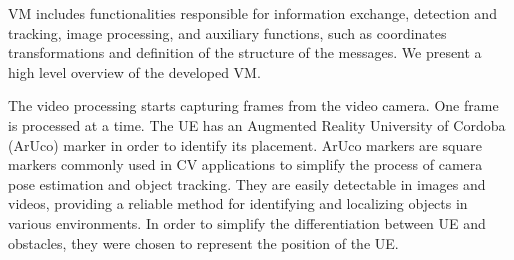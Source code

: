 \begin{table}[H]
    \caption{Summary of each message type.}
    \label{tab:message_type}
    \centering
\end{table}

VM includes functionalities responsible for information exchange, detection and tracking, image processing, and auxiliary functions, such as coordinates transformations and definition of the structure of the messages.
We present a high level overview of the developed VM\@.

The video processing starts capturing frames from the video camera.
One frame is processed at a time.
The UE has an Augmented Reality University of Cordoba (ArUco) marker in order to identify its placement.
ArUco markers are square markers commonly used in CV applications to simplify the process of camera pose estimation and object tracking.
They are easily detectable in images and videos, providing a reliable method for identifying and localizing objects in various environments.
In order to simplify the differentiation between UE and obstacles, they were chosen to represent the position of the UE\@.

